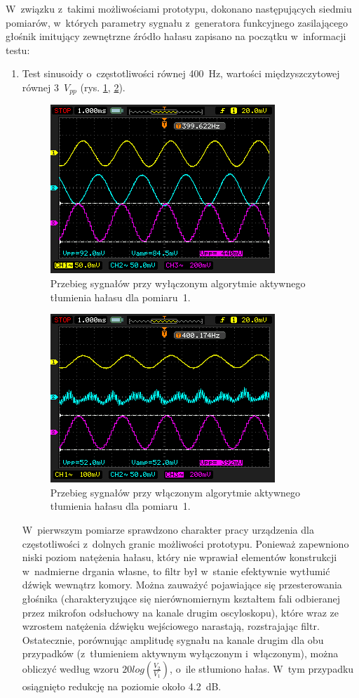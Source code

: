 W~związku z~takimi możliwościami prototypu, dokonano następujących siedmiu pomiarów, w~których parametry sygnału z~generatora funkcyjnego zasilającego głośnik imitujący zewnętrzne źródło hałasu zapisano na początku w~informacji testu:
\begin{enumerate}
	\item Test sinusoidy o~częstotliwości równej \SI{400}{\Hz}, wartości międzyszczytowej równej 3~$V_{pp}$ (rys. \ref{fig:test_1_off}, \ref{fig:test_1_on}).\\
	\begin{figure}[h!]
		\centering
		\includegraphics[scale=0.7]{../Assets/Results/1_400_3_off.png}
		\caption{Przebieg sygnałów przy wyłączonym algorytmie aktywnego tłumienia hałasu dla pomiaru~1.}
		\label{fig:test_1_off}
	\end{figure}
	\begin{figure}[h!]
		\centering
		\includegraphics[scale=0.7]{../Assets/Results/1_400_3_on.png}
		\caption{Przebieg sygnałów przy włączonym algorytmie aktywnego tłumienia hałasu dla pomiaru~1.}
		\label{fig:test_1_on}
	\end{figure}
	W~pierwszym pomiarze sprawdzono charakter pracy urządzenia dla częstotliwości z~dolnych granic możliwości prototypu. Ponieważ zapewniono niski poziom natężenia hałasu, który nie wprawiał elementów konstrukcji w~nadmierne drgania własne, to filtr był w~stanie efektywnie wytłumić dźwięk wewnątrz komory. Można zauważyć pojawiające się przesterowania głośnika (charakteryzujące się nierównomiernym kształtem fali odbieranej przez mikrofon odsłuchowy na kanale drugim oscyloskopu), które wraz ze wzrostem natężenia dźwięku wejściowego narastają, rozstrajając filtr. Ostatecznie, porównując amplitudę sygnału na kanale drugim dla obu przypadków (z~tłumieniem aktywnym wyłączonym i~włączonym), można obliczyć według wzoru $20log(\frac{V_2}{V_1})$, o~ile stłumiono hałas. W~tym przypadku osiągnięto redukcję na poziomie około \SI{4,2}{\dB}.

\end{enumerate}
